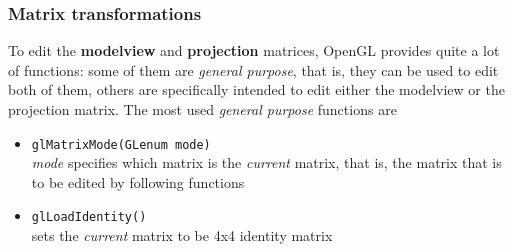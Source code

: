 \subsubsection{Matrix transformations}
To edit the \textbf{modelview} and \textbf{projection} matrices, OpenGL 
provides quite a lot of functions: some of them are 
\textit{general purpose}, that is, they can be used to edit both of them, 
others are specifically intended to edit either the modelview or the 
projection matrix.
%
The most used \textit{general purpose} functions are 
%
\begin{itemize}
\item \texttt{glMatrixMode(GLenum mode)} \\
  \textit{mode} specifies which matrix is the \textit{current}
  matrix, that is, the matrix that is to be edited by following
  functions

\item \texttt{glLoadIdentity()} \\
  sets the \textit{current} matrix to be 4x4 identity matrix
\end{itemize}
%

